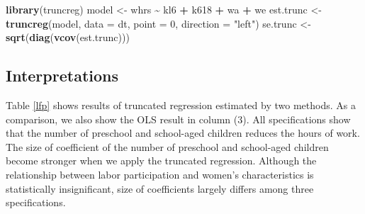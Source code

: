 \documentclass[
  12pt,
]{article}
\newenvironment{Shaded}{\begin{snugshade}}{\end{snugshade}}
\newcommand{\DataTypeTok}[1]{\textcolor[rgb]{0.13,0.29,0.53}{#1}}
\newcommand{\DecValTok}[1]{\textcolor[rgb]{0.00,0.00,0.81}{#1}}
\newcommand{\KeywordTok}[1]{\textcolor[rgb]{0.13,0.29,0.53}{\textbf{#1}}}
\newcommand{\NormalTok}[1]{#1}
\newcommand{\OperatorTok}[1]{\textcolor[rgb]{0.81,0.36,0.00}{\textbf{#1}}}
\newcommand{\StringTok}[1]{\textcolor[rgb]{0.31,0.60,0.02}{#1}}
\begin{document}
\begin{Shaded}
\begin{Highlighting}[]
\KeywordTok{library}\NormalTok{(truncreg)}
\NormalTok{model \textless{}{-}}\StringTok{ }\NormalTok{whrs }\OperatorTok{\textasciitilde{}}\StringTok{ }\NormalTok{kl6 }\OperatorTok{+}\StringTok{ }\NormalTok{k618 }\OperatorTok{+}\StringTok{ }\NormalTok{wa }\OperatorTok{+}\StringTok{ }\NormalTok{we}
\NormalTok{est.trunc \textless{}{-}}\StringTok{ }\KeywordTok{truncreg}\NormalTok{(model, }\DataTypeTok{data =}\NormalTok{ dt, }\DataTypeTok{point =} \DecValTok{0}\NormalTok{, }\DataTypeTok{direction =} \StringTok{"left"}\NormalTok{)}
\NormalTok{se.trunc \textless{}{-}}\StringTok{ }\KeywordTok{sqrt}\NormalTok{(}\KeywordTok{diag}\NormalTok{(}\KeywordTok{vcov}\NormalTok{(est.trunc)))}
\end{Highlighting}
\end{Shaded}

\hypertarget{interpretations}{%
\subsection{Interpretations}\label{interpretations}}

Table \ref{lfp} shows results of truncated regression estimated by two
methods. As a comparison, we also show the OLS result in column (3). All
specifications show that the number of preschool and school-aged
children reduces the hours of work. The size of coefficient of the
number of preschool and school-aged children become stronger when we
apply the truncated regression. Although the relationship between labor
participation and women's characteristics is statistically
insignificant, size of coefficients largely differs among three
specifications.
\end{document}
